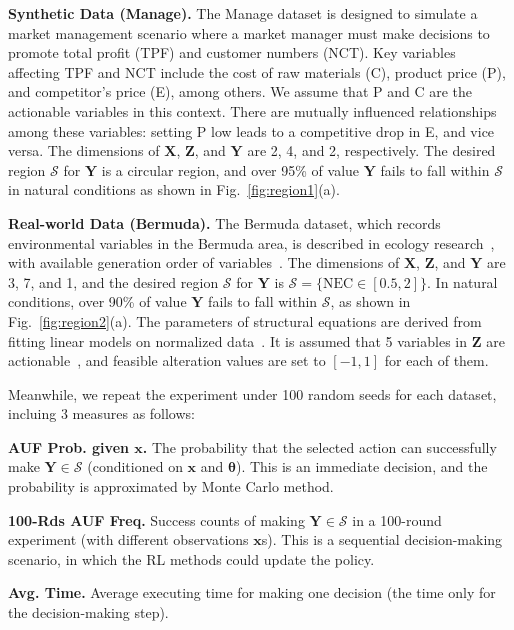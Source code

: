 \documentclass{article}
\theoremstyle{plain}
\theoremstyle{definition}
\def \x {\mathbf{x}}
\def \X {\mathbf{X}}
\def \Y{\mathbf{Y}}
\def \Fig {Fig.}
\def \x {\mathbf{x}}
\def \Z {\mathbf{Z}}
\def \sS {\mathcal{S}}
\def \X {\mathbf{X}}
\def \Y {\mathbf{Y}}
\begin{document}
\noindent \textbf{Synthetic Data (Manage).} 
The Manage dataset is designed to simulate a market management scenario where a market manager must make decisions to promote total profit (TPF) and customer numbers (NCT). 
Key variables affecting TPF and NCT include the cost of raw materials (C), product price (P), and competitor's price (E), among others. 
We assume that P and C are the actionable variables in this context.
There are mutually influenced relationships among these variables: setting P low leads to a competitive drop in E, and vice versa.
The dimensions of $\X$, $\Z$, and $\Y$ are 2, 4, and 2, respectively.
The desired region $\sS$ for $\Y$ is a circular region, and over 95\% of value $\Y$ fails to fall within \(\sS\) in natural conditions as shown in \Fig~\ref{fig:region1}(a).


\noindent \textbf{Real-world Data (Bermuda).}
The Bermuda dataset, which records environmental variables in the Bermuda area, is described in ecology research~\citep{courtney2017environmental}, with available generation order of variables~\citep{bermuda_dataset}. The dimensions of $\X$, $\Z$, and $\Y$ are 3, 7, and 1, and the desired region $\sS$ for $\Y$ is $\sS=\{\text{NEC}\in[0.5, 2]\}$.
In natural conditions, over 90\% of value $\Y$ fails to fall within \(\sS\), as shown in \Fig~\ref{fig:region2}(a). 
The parameters of structural equations are derived from fitting linear models on normalized data~\citep{qint2023srm}. It is assumed that 5 variables in $\Z$ are actionable~\citep{aglietti2020causal}, and feasible alteration values are set to $[-1, 1]$ for each of them.

Meanwhile, we repeat the experiment under 100 random seeds for each dataset, incluing 3 measures as follows:
\vspace*{-0.02in}
\begin{compactenum}
  \item \textbf{AUF Prob. given $\x$.} The probability that the selected action can successfully make $\Y\in\sS$ (conditioned on $\x$ and $\bm{\theta}$). This is an immediate decision, and the probability is approximated by Monte Carlo method.
  \item \textbf{100-Rds AUF Freq.} Success counts of making $\Y\in\sS$ in a 100-round experiment (with different observations $\x$s). This is a sequential decision-making scenario, in which the RL methods could update the policy. 
  \item \textbf{Avg. Time.} Average executing time for making one decision (the time only for the decision-making step). 
\end{compactenum}
\end{document}
